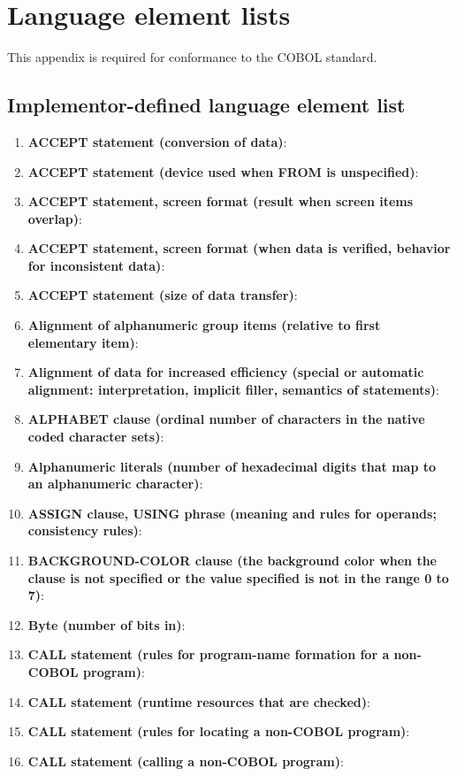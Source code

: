 \chapter{Language element lists}

This appendix is required for conformance to the COBOL standard.

\section{Implementor-defined language element list}

\begin{enumerate}
\item \textbf{ACCEPT statement (conversion of data)}:
\item \textbf{ACCEPT statement (device used when FROM is unspecified)}:
\item \textbf{ACCEPT statement, screen format (result when screen items overlap)}:
\item \textbf{ACCEPT statement, screen format (when data is verified, behavior for inconsistent data)}:
\item \textbf{ACCEPT statement (size of data transfer)}:
\item \textbf{Alignment of alphanumeric group items (relative to first elementary item)}:
\item \textbf{Alignment of data for increased efficiency (special or automatic alignment: interpretation, implicit filler, semantics of statements)}:
\item \textbf{ALPHABET clause (ordinal number of characters in the native coded character sets)}:
\item \textbf{Alphanumeric literals (number of hexadecimal digits that map to an alphanumeric character)}:
\item \textbf{ASSIGN clause, USING phrase (meaning and rules for operands; consistency rules)}:
\item \textbf{BACKGROUND-COLOR clause (the background color when the clause is not specified or the value specified is not in the range 0 to 7)}:
\item \textbf{Byte (number of bits in)}:
\item \textbf{CALL statement (rules for program-name formation for a non-COBOL program)}:
\item \textbf{CALL statement (runtime resources that are checked)}:
\item \textbf{CALL statement (rules for locating a non-COBOL program)}:
\item \textbf{CALL statement (calling a non-COBOL program)}:

\end{enumerate}
